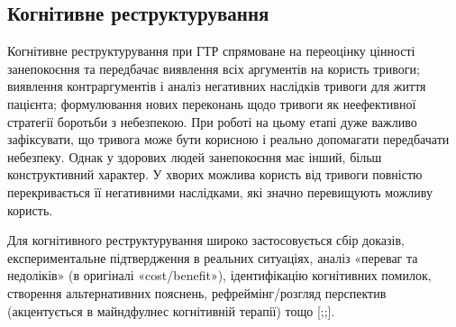 \documentclass[twocolumn]{article}
\begin{document}
\subsection {Когнітивне реструктурування}
\par Когнітивне реструктурування при ГТР спрямоване на переоцінку цінності занепокоєння та передбачає  виявлення всіх аргументів на користь тривоги; виявлення контраргументів і аналіз негативних наслідків тривоги для життя пацієнта; формулювання нових переконань щодо тривоги як неефективної стратегії боротьби з небезпекою. При роботі на цьому етапі дуже важливо зафіксувати, що тривога може бути корисною і реально допомагати передбачати небезпеку. Однак у здорових людей занепокоєння має інший, більш конструктивний характер. У хворих можлива користь від тривоги повністю перекривається її негативними наслідками, які значно перевищують можливу користь.
\par Для когнітивного реструктурування широко застосовується сбір доказів, експериментальне підтвердження в реальних ситуаціях, аналіз «переваг та недоліків» (в оригіналі «cost/benefit»), ідентифікацію когнітивних помилок, створення альтернативних пояснень, рефреймінг/розгляд перспектив (акцентується в майндфулнес когнітивній терапії) тощо [\cite{bib19};\cite{bib20};\cite{bib21}].
\end{document}
